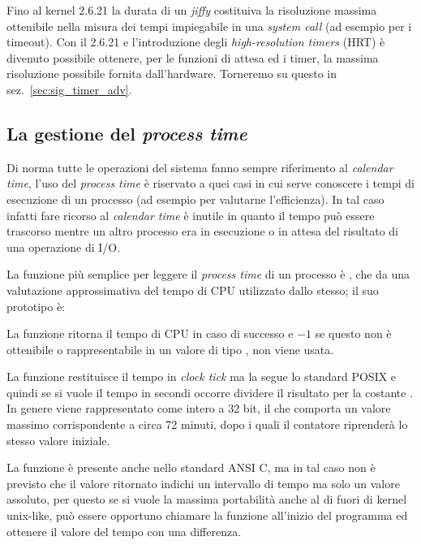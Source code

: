 Fino al kernel 2.6.21 la durata di un \textit{jiffy} costituiva la risoluzione
massima ottenibile nella misura dei tempi impiegabile in una \textit{system
  call} (ad esempio per i timeout). Con il 2.6.21 e l'introduzione degli
\textit{high-resolution timers} (HRT) è divenuto possibile ottenere, per le
funzioni di attesa ed i timer, la massima risoluzione possibile fornita
dall'hardware. Torneremo su questo in sez.~\ref{sec:sig_timer_adv}.



\subsection{La gestione del \textit{process time}}
\label{sec:sys_cpu_times}

Di norma tutte le operazioni del sistema fanno sempre riferimento al
\textit{calendar time}, l'uso del \textit{process time} è riservato a
quei casi in cui serve conoscere i tempi di esecuzione di un processo
(ad esempio per valutarne l'efficienza). In tal caso infatti fare
ricorso al \textit{calendar time} è inutile in quanto il tempo può
essere trascorso mentre un altro processo era in esecuzione o in
attesa del risultato di una operazione di I/O.

La funzione più semplice per leggere il \textit{process time} di un processo è
, che da una valutazione approssimativa del tempo di CPU
utilizzato dallo stesso; il suo prototipo è:

\begin{funcproto}{
}

{La funzione ritorna il tempo di CPU in caso di successo e $-1$ se questo non
  è ottenibile o rappresentabile in un valore di tipo ,
   non viene usata.}  
\end{funcproto}

La funzione restituisce il tempo in \textit{clock tick} ma la 
segue lo standard POSIX e quindi se si vuole il tempo in secondi occorre
dividere il risultato per la costante . In genere
 viene rappresentato come intero a 32 bit, il che comporta un
valore massimo corrispondente a circa 72 minuti, dopo i quali il contatore
riprenderà lo stesso valore iniziale.

La funzione è presente anche nello standard ANSI C, ma in tal caso non è
previsto che il valore ritornato indichi un intervallo di tempo ma solo un
valore assoluto, per questo se si vuole la massima portabilità anche al di
fuori di kernel unix-like, può essere opportuno chiamare la funzione
all'inizio del programma ed ottenere il valore del tempo con una differenza.

